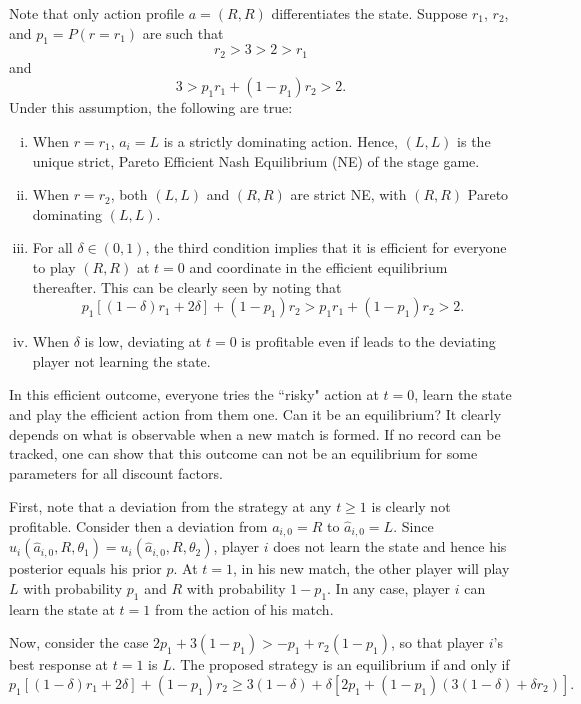 \documentclass[12pt,letterpaper]{article}
\begin{document}
Note that only action profile $a=(R,R)$ differentiates the state. Suppose $r_1$, $r_2$, and $p_1=P(r=r_1)$ are such that $$r_2>3>2>r_1$$ and $$3>p_1r_1+(1-p_1)r_2>2.$$ Under this assumption, the following are true:

\begin{enumerate}[i.]
    \item When $r=r_1$, $a_i=L$ is a strictly dominating action. Hence, $(L,L)$ is the unique strict, Pareto Efficient Nash Equilibrium (NE) of the stage game.

    \item When $r=r_2$, both $(L,L)$ and $(R,R)$ are strict NE, with $(R,R)$ Pareto dominating $(L,L)$.

    \item For all $\delta\in(0,1)$, the third condition implies that it is efficient for everyone to play $(R,R)$ at $t=0$ and coordinate in the efficient equilibrium thereafter. This can be clearly seen by noting that \begin{equation*}
        p_1[(1-\delta)r_1+2\delta]+(1-p_1)r_2>p_1r_1+(1-p_1)r_2>2.
    \end{equation*}

    \item When $\delta$ is low, deviating at $t=0$ is profitable even if leads to the deviating player not learning the state.
\end{enumerate}

In this efficient outcome, everyone tries the ``risky" action at $t=0$, learn the state and play the efficient action from them one. Can it be an equilibrium? It clearly depends on what is observable when a new match is formed. If no record can be tracked, one can show that this outcome can not be an equilibrium for some parameters for all discount factors.

First, note that a deviation from the strategy at any $t\geq 1$ is clearly not profitable. Consider then a deviation from $a_{i,0}=R$ to $\hat{a}_{i,0}=L$. Since $u_i(\hat{a}_{i,0},R,\theta_1)=u_i(\hat{a}_{i,0},R,\theta_2)$, player $i$ does not learn the state and hence his posterior equals his prior $p$. At $t=1$, in his new match, the other player will play $L$ with probability $p_1$ and $R$ with probability $1-p_1$. In any case, player $i$ can learn the state at $t=1$ from the action of his match.

Now, consider the case $2p_1+3(1-p_1)>-p_1+r_2(1-p_1)$, so that player $i$'s best response at $t=1$ is $L$. The proposed strategy is an equilibrium if and only if \begin{equation*}
    p_1[(1-\delta)r_1+2\delta]+(1-p_1)r_2 \geq 3(1-\delta)+\delta[2p_1+(1-p_1)(3(1-\delta)+\delta r_2)].
\end{equation*}
\end{document}
